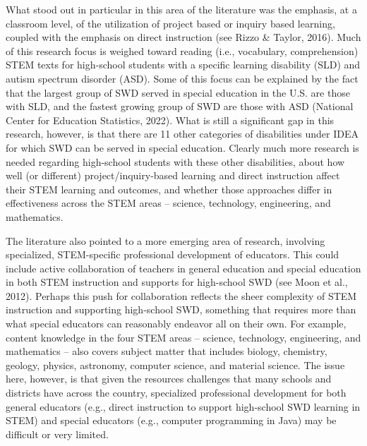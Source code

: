 \documentclass[11pt]{sig-alternate}
\begin{document}
\begin{large}
What stood out in particular in this area of the literature was the emphasis, at a classroom level, of the utilization of project based or inquiry based learning, coupled with the emphasis on direct instruction (see Rizzo \& Taylor, 2016). Much of this research focus is weighed toward reading (i.e., vocabulary, comprehension) STEM texts for high-school students with a specific learning disability (SLD) and autism spectrum disorder (ASD). Some of this focus can be explained by the fact that the largest group of SWD served in special education in the U.S. are those with SLD, and the fastest growing group of SWD are those with ASD (National Center for Education Statistics, 2022). What is still a significant gap in this research, however, is that there are 11 other categories of disabilities under IDEA for which SWD can be served in special education. Clearly much more research is needed regarding high-school students with these other disabilities, about how well (or different) project/inquiry-based learning and direct instruction affect their STEM learning and outcomes, and whether those approaches differ in effectiveness across the STEM areas – science, technology, engineering, and mathematics.  

The literature also pointed to a more emerging area of research, involving specialized, STEM-specific professional development of educators. This could include active collaboration of teachers in general education and special education in both STEM instruction and supports for high-school SWD (see Moon et al., 2012). Perhaps this push for collaboration reflects the sheer complexity of STEM instruction and supporting high-school SWD, something that requires more than what special educators can reasonably endeavor all on their own. For example, content knowledge in the four STEM areas – science, technology, engineering, and mathematics – also covers subject matter that includes biology, chemistry, geology, physics, astronomy, computer science, and material science. The issue here, however, is that given the resources challenges that many schools and districts have across the country, specialized professional development for both general educators (e.g., direct instruction to support high-school SWD learning in STEM) and special educators (e.g., computer programming in Java) may be difficult or very limited. 


\end{large}
\end{document}
